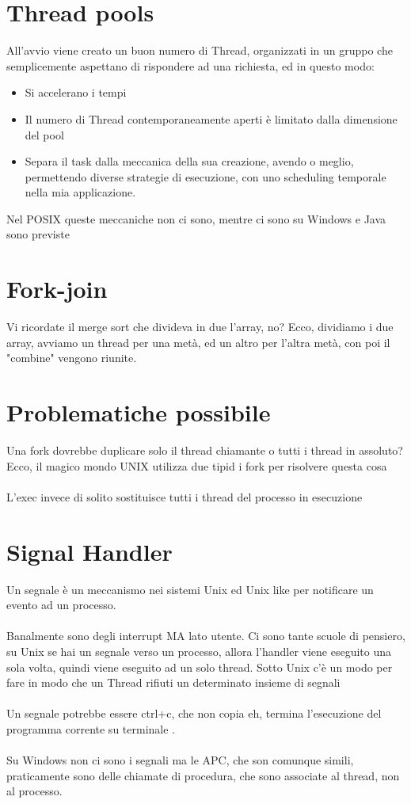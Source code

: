 \documentclass[12pt, a4paper, openany, twoside]{book}
\begin{document}
\section{Thread pools}
All'avvio viene creato un buon numero di Thread, organizzati in un gruppo che 
semplicemente aspettano di rispondere ad una richiesta, ed in questo modo:
\begin{itemize}
	\item Si accelerano i tempi
	\item Il numero di Thread contemporaneamente aperti è limitato dalla dimensione
	del pool
	\item Separa il task dalla meccanica della sua creazione, avendo o meglio,
	permettendo diverse strategie di esecuzione, con uno scheduling temporale
	nella mia applicazione.
\end{itemize}
Nel POSIX queste meccaniche non ci sono, mentre ci sono su Windows e Java sono
previste
\section{Fork-join}
Vi ricordate il merge sort che divideva in due l'array, no? Ecco, dividiamo
i due array, avviamo un thread per una metà, ed un altro per l'altra metà,
con poi il "combine" vengono riunite.
\section{Problematiche possibile}
Una fork dovrebbe duplicare solo il thread chiamante o tutti i thread in assoluto?
Ecco, il magico mondo UNIX utilizza due tipid i fork per risolvere questa cosa\\ \\
L'exec invece di solito sostituisce tutti i thread del processo
in esecuzione
\section{Signal Handler}
Un segnale è un meccanismo nei sistemi Unix ed Unix like per notificare un evento
ad un processo. \\ \\
Banalmente sono degli interrupt MA lato utente. Ci sono tante scuole di pensiero,
su Unix se hai un segnale verso un processo, allora l'handler viene eseguito
una sola volta, quindi viene eseguito ad un solo thread. Sotto Unix c'è un modo
per fare in modo che un Thread rifiuti un determinato insieme di segnali\\ \\
Un segnale potrebbe essere ctrl+c, che non copia eh, termina l'esecuzione del
programma corrente su terminale .\\ \\
Su Windows non ci sono i segnali ma le APC, che son comunque simili, praticamente
sono delle chiamate di procedura, che sono associate al thread, non al processo.
\end{document}
